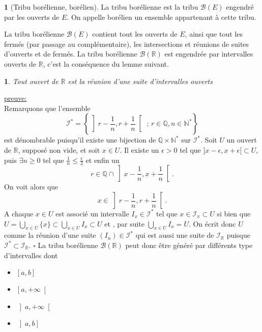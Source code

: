 \documentclass[8pt,notheorems]{beamer}
\def \R{\mathbb R}
\newtheorem{lemma}{\translate{Lemme}}
\theoremstyle{definition}
\newtheorem{definition}{\translate{Definition}}
\theoremstyle{example}
\theoremstyle{mystyle}
\theoremstyle{plain}
\begin{document}
\begin{frame}[allowframebreaks]
\begin{definition}[Tribu borélienne, borélien]
La tribu borélienne est la tribu $\mathcal{B}(E)$ engendré par les ouverts de $E$. On appelle borélien un ensemble appartenant à cette tribu.
\end{definition}
La tribu borélienne $\mathcal{B}(E)$ contient tout les ouverts de $E$, ainsi que tout les fermés (par passage au complémentaire), les intersections et réunions de suites d'ouverts et de fermés. La tribu borélienne $\mathcal{B}(\mathbb{R})$ est engendrée par intervalles ouverts de $\mathbb{R}$, c'est la conséquence du lemme suivant.
\begin{lemma}
Tout ouvert de $\mathbb{R}$ est la réunion d'une suite d'intervalles ouverts
\end{lemma}
\underline{preuve:}\\
Remarquons que l'ensemble
$$
\mathcal{I}^{\ast}=\left\{\left]r-\frac{1}{n},r+\frac{1}{n}\right[\text{ ; }r\in\mathbb{Q},n\in\mathbb{N}^{\ast} \right\}
$$
est dénombrable puisqu'il existe une bijection de $\mathbb{Q}\times\mathbb{N}^{\ast}$ sur $\mathcal{I}^{\ast}$. Soit $U$ un ouvert de $\mathbb{R}$, supposé non vide, et soit $x\in U$. Il existe un $\epsilon>0$ tel que $]x-\epsilon,x+\epsilon[\subset U$, puis $\exists n\geq0$ tel que $\frac{1}{n}\leq\frac{\epsilon}{2}$ et enfin un
$$
r\in\mathbb{Q}\cap\left]x-\frac{1}{n},x+\frac{1}{n}\right[.
$$
On voit alors que
$$
x\in\left]r-\frac{1}{n},r+\frac{1}{n}\right[.
$$
A chaque $x\in U$ est associé un intervalle $I_x\in\mathcal{I}^{\ast}$ tel que $x\in\mathcal{I}_x\subset U$ si bien que $U=\bigcup_{x\in U}\{x\}\subset\bigcup_{x\in U}I_x\subset U$ et , par suite $\bigcup_{x\in U}I_x=U$. On écrit donc $U$ comme la réunion d'une suite $(I_n)\in\mathcal{I}^{\ast}$ qui est aussi une suite de $\mathcal{I}_{\R}$ puisque $\mathcal{I}^{\ast}\subset\mathcal{I}_{\R}$.
\flushright$\square$
\flushleft
La tribu borélienne $\mathcal{B}(\mathbb{R})$ peut donc être généré par différents type d'intervalles dont
\begin{itemize}
\item $\left[a,b\right]$
\item $\left[a,+\infty\right[$
\item $\left]a,+\infty\right[$
\item $\left]a,b\right]$
\end{itemize}
\end{frame}
\end{document}
